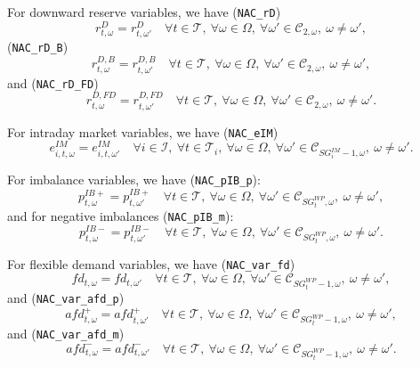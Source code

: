 \documentclass{article}
\begin{document}
For downward reserve variables, we have (\verb|NAC_rD|)
\begin{equation} \label{EQ:NAC_pVRD}
	r^D_{t, \omega} = r^D_{t, \omega'} \quad \forall t \in \mathcal{T}, \ \forall \omega \in \Omega, \ \forall \omega' \in \mathcal{C}_{2, \omega}, \ \omega \neq \omega',
\end{equation}
(\verb|NAC_rD_B|)
\begin{equation} \label{EQ:NAC_rDB}
	r^{D, B}_{t, \omega} = r^{D, B}_{t, \omega'} \quad \forall t \in \mathcal{T}, \ \forall \omega \in \Omega, \ \forall \omega' \in \mathcal{C}_{2, \omega}, \ \omega \neq \omega',
\end{equation}
and (\verb|NAC_rD_FD|)
\begin{equation} \label{EQ:NAC_rDFD}
	r^{D, FD}_{t, \omega} = r^{D, FD}_{t, \omega'} \quad \forall t \in \mathcal{T}, \ \forall \omega \in \Omega, \ \forall \omega' \in \mathcal{C}_{2, \omega}, \ \omega \neq \omega'.
\end{equation}


For intraday market variables, we have (\verb|NAC_eIM|)
\begin{equation} \label{EQ:NAC_mUC}
	e^{IM}_{i, t, \omega} = e^{IM}_{i, t, \omega'} \quad \forall i \in \mathcal{I}, \ \forall t \in \mathcal{T}_i, \ \forall \omega \in \Omega, \ \forall \omega' \in \mathcal{C}_{SG^{IM}_i -1, \omega}, \ \omega \neq \omega'.
\end{equation}


For imbalance variables, we have (\verb|NAC_pIB_p|):
\begin{equation} \label{EQ:NAC_pPIB}
	p^{IB+}_{t, \omega} = p^{IB+}_{t, \omega'} \quad \forall t \in \mathcal{T}, \ \forall \omega \in \Omega, \ \forall \omega' \in \mathcal{C}_{SG^{WP}_t, \omega}, \ \omega \neq \omega',
\end{equation}
and for negative imbalances (\verb|NAC_pIB_m|):
\begin{equation} \label{EQ:NAC_pNIB}
	p^{IB-}_{t, \omega} = p^{IB-}_{t, \omega'} \quad \forall t \in \mathcal{T}, \ \forall \omega \in \Omega, \ \forall \omega' \in \mathcal{C}_{SG^{WP}_t, \omega}, \ \omega \neq \omega'.
\end{equation}


For flexible demand variables, we have (\verb|NAC_var_fd|)
\begin{equation} \label{EQ:NAC_var_fd}
	fd_{t, \omega} = fd_{t, \omega'} \quad \forall t \in \mathcal{T}, \ \forall \omega \in \Omega, \ \forall \omega' \in \mathcal{C}_{SG^{WP}_t - 1, \omega}, \ \omega \neq \omega',
\end{equation}
and (\verb|NAC_var_afd_p|)
\begin{equation} \label{EQ:NAC_var_afd_p}
	afd^+_{t, \omega} = afd^+_{t, \omega'} \quad \forall t \in \mathcal{T}, \ \forall \omega \in \Omega, \ \forall \omega' \in \mathcal{C}_{SG^{WP}_t - 1, \omega}, \ \omega \neq \omega',
\end{equation}
and (\verb|NAC_var_afd_m|)
\begin{equation} \label{EQ:NAC_var_afd_m}
	afd^-_{t, \omega} = afd^-_{t, \omega'} \quad \forall t \in \mathcal{T}, \ \forall \omega \in \Omega, \ \forall \omega' \in \mathcal{C}_{SG^{WP}_t - 1, \omega}, \ \omega \neq \omega'.
\end{equation}
\end{document}
